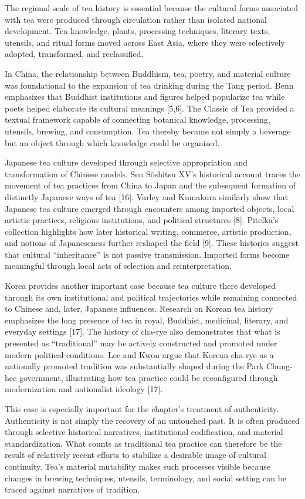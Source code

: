 \documentclass[11pt,a4paper]{article}
\begin{document}
The regional scale of tea history is essential because the cultural forms associated with tea were produced through circulation rather than isolated national development. Tea knowledge, plants, processing techniques, literary texts, utensils, and ritual forms moved across East Asia, where they were selectively adopted, transformed, and reclassified.

In China, the relationship between Buddhism, tea, poetry, and material culture was foundational to the expansion of tea drinking during the Tang period. Benn emphasizes that Buddhist institutions and figures helped popularize tea while poets helped elaborate its cultural meanings [5,6]. The Classic of Tea provided a textual framework capable of connecting botanical knowledge, processing, utensils, brewing, and consumption. Tea thereby became not simply a beverage but an object through which knowledge could be organized.

Japanese tea culture developed through selective appropriation and transformation of Chinese models. Sen Sōshitsu XV's historical account traces the movement of tea practices from China to Japan and the subsequent formation of distinctly Japanese ways of tea [16]. Varley and Kumakura similarly show that Japanese tea culture emerged through encounters among imported objects, local artistic practices, religious institutions, and political structures [8]. Pitelka's collection highlights how later historical writing, commerce, artistic production, and notions of Japaneseness further reshaped the field [9]. These histories suggest that cultural ``inheritance'' is not passive transmission. Imported forms become meaningful through local acts of selection and reinterpretation.

Korea provides another important case because tea culture there developed through its own institutional and political trajectories while remaining connected to Chinese and, later, Japanese influences. Research on Korean tea history emphasizes the long presence of tea in royal, Buddhist, medicinal, literary, and everyday settings [17]. The history of cha-rye also demonstrates that what is presented as ``traditional'' may be actively constructed and promoted under modern political conditions. Lee and Kwon argue that Korean cha-rye as a nationally promoted tradition was substantially shaped during the Park Chung-hee government, illustrating how tea practice could be reconfigured through modernization and nationalist ideology [17].

This case is especially important for the chapter's treatment of authenticity. Authenticity is not simply the recovery of an untouched past. It is often produced through selective historical narratives, institutional codification, and material standardization. What counts as traditional tea practice can therefore be the result of relatively recent efforts to stabilize a desirable image of cultural continuity. Tea's material mutability makes such processes visible because changes in brewing techniques, utensils, terminology, and social setting can be traced against narratives of tradition.
\end{document}
